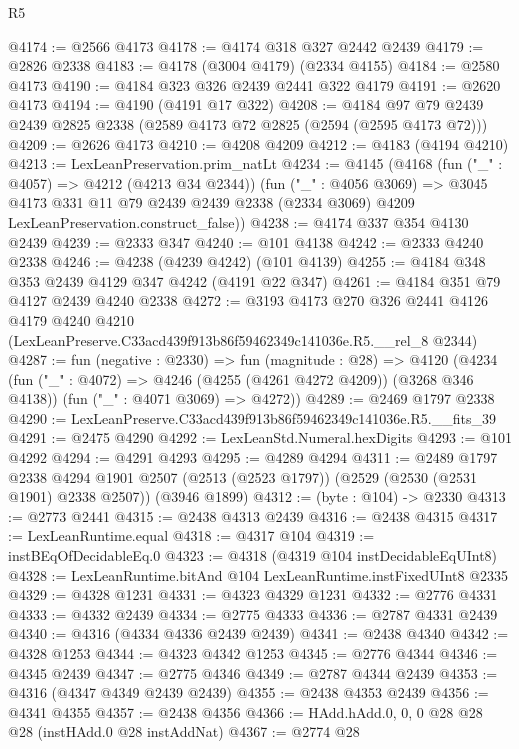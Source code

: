 \begin{lexlean}{R5}
\begin{coremodule}
@4174 := @2566 @4173
@4178 := @4174 @318 @327 @2442 @2439
@4179 := @2826 @2338
@4183 := @4178 (@3004 @4179) (@2334 @4155)
@4184 := @2580 @4173
@4190 := @4184 @323 @326 @2439 @2441 @322 @4179
@4191 := @2620 @4173
@4194 := @4190 (@4191 @17 @322)
@4208 := @4184 @97 @79 @2439 @2439 @2825 @2338 (@2589 @4173 @72 @2825 (@2594 (@2595 @4173 @72)))
@4209 := @2626 @4173
@4210 := @4208 @4209
@4212 := @4183 (@4194 @4210)
@4213 := LexLeanPreservation.prim_natLt
@4234 := @4145
    (@4168
      (fun ("_" : @4057) => @4212 (@4213 @34 @2344))
      (fun ("_" : @4056 @3069) =>
      @3045
        @4173
        @331
        @11
        @79
        @2439
        @2439
        @2338
        (@2334 @3069)
        @4209
        LexLeanPreservation.construct_false))
@4238 := @4174 @337 @354 @4130 @2439
@4239 := @2333 @347
@4240 := @101 @4138
@4242 := @2333 @4240 @2338
@4246 := @4238 (@4239 @4242) (@101 @4139)
@4255 := @4184 @348 @353 @2439 @4129 @347 @4242 (@4191 @22 @347)
@4261 := @4184 @351 @79 @4127 @2439 @4240 @2338
@4272 := @3193
    @4173
    @270
    @326
    @2441
    @4126
    @4179
    @4240
    @4210
    (LexLeanPreserve.C33acd439f913b86f59462349c141036e.R5.__rel_8 @2344)
@4287 := fun (negative : @2330) =>
  fun (magnitude : @28) =>
  @4120
    (@4234
      (fun ("_" : @4072) => @4246 (@4255 (@4261 @4272 @4209)) (@3268 @346 @4138))
      (fun ("_" : @4071 @3069) => @4272))
@4289 := @2469 @1797 @2338
@4290 := LexLeanPreserve.C33acd439f913b86f59462349c141036e.R5.__fits_39
@4291 := @2475 @4290
@4292 := LexLeanStd.Numeral.hexDigits
@4293 := @101 @4292
@4294 := @4291 @4293
@4295 := @4289 @4294
@4311 := @2489
    @1797
    @2338
    @4294
    @1901
    @2507
    (@2513 (@2523 @1797))
    (@2529 (@2530 (@2531 @1901) @2338 @2507))
    (@3946 @1899)
@4312 := (byte : @104) -> @2330
@4313 := @2773 @2441
@4315 := @2438 @4313 @2439
@4316 := @2438 @4315
@4317 := LexLeanRuntime.equal
@4318 := @4317 @104
@4319 := instBEqOfDecidableEq.{0}
@4323 := @4318 (@4319 @104 instDecidableEqUInt8)
@4328 := LexLeanRuntime.bitAnd @104 LexLeanRuntime.instFixedUInt8 @2335
@4329 := @4328 @1231
@4331 := @4323 @4329 @1231
@4332 := @2776 @4331
@4333 := @4332 @2439
@4334 := @2775 @4333
@4336 := @2787 @4331 @2439
@4340 := @4316 (@4334 @4336 @2439 @2439)
@4341 := @2438 @4340
@4342 := @4328 @1253
@4344 := @4323 @4342 @1253
@4345 := @2776 @4344
@4346 := @4345 @2439
@4347 := @2775 @4346
@4349 := @2787 @4344 @2439
@4353 := @4316 (@4347 @4349 @2439 @2439)
@4355 := @2438 @4353 @2439
@4356 := @4341 @4355
@4357 := @2438 @4356
@4366 := HAdd.hAdd.{0, 0, 0} @28 @28 @28 (instHAdd.{0} @28 instAddNat)
@4367 := @2774 @28

\end{coremodule}
\end{lexlean}
